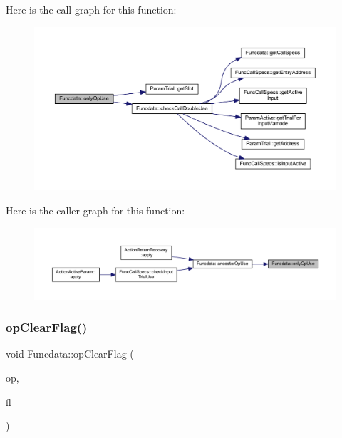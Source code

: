 Here is the call graph for this function\+:
\nopagebreak
\begin{figure}[H]
\begin{center}
\leavevmode
\includegraphics[width=350pt]{class_funcdata_a07ddc6cd232b4a101968d960fda9b965_cgraph}
\end{center}
\end{figure}
Here is the caller graph for this function\+:
\nopagebreak
\begin{figure}[H]
\begin{center}
\leavevmode
\includegraphics[width=350pt]{class_funcdata_a07ddc6cd232b4a101968d960fda9b965_icgraph}
\end{center}
\end{figure}
\mbox{\label{class_funcdata_a7241e6861853d664cbcaed94e29fb57e}} 
\subsubsection{\texorpdfstring{opClearFlag()}{opClearFlag()}}
{\footnotesize\ttfamily void Funcdata\+::op\+Clear\+Flag (\begin{DoxyParamCaption}\item[{\mbox{\hyperlink{class_pcode_op}{Pcode\+Op}} $\ast$}]{op,  }\item[{uint4}]{fl }\end{DoxyParamCaption})\hspace{0.3cm}{\ttfamily [inline]}}



